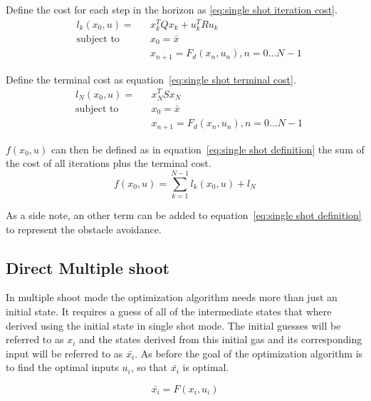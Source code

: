 			Define the cost for each step in the horizon as \ref{eq:single shot iteration cost}.
			\begin{equation}
				\begin{aligned}
				& l_k(x_0,u) = &&  x_k^T Q x_k  +  u_k^T R u_k \\
				& \text{subject to}			&& x_0 = \bar{x} \\
				& 							&&  x_{n+1} = F_d(x_n,u_n), n=0...N-1
				\end{aligned}
				\label{eq:single shot iteration cost}
			\end{equation}
			
			Define the terminal cost as equation~\ref{eq:single shot terminal cost}.
			\begin{equation}
				\begin{aligned}
					& l_N(x_0,u) = && x_N^TSx_N \\
					& \text{subject to}			&& x_0 = \bar{x} \\
					& 							&&  x_{n+1} = F_d(x_n,u_n), n=0...N-1
				\end{aligned}
				\label{eq:single shot terminal cost}
			\end{equation}
			
			$f(x_0,u)$ can then be defined as in equation~\ref{eq:single shot definition} the sum of the cost of all iterations plus the terminal cost.
			\begin{equation}
				f(x_0,u) = \sum_{k=1}^{N-1} l_k(x_0,u) + l_N
				\label{eq:single shot definition}
			\end{equation}
			
			As a side note, an other term can be added to equation~\ref{eq:single shot definition} to represent the obstacle avoidance.
		\subsection{Direct Multiple shoot}
			In multiple shoot mode the optimization algorithm needs more than just an initial state. It requires a guess of all of the intermediate states that where derived using the initial state in  single shot mode. The initial guesses will be referred to as $x_i$ and the states derived from this initial gas and its corresponding input will be referred to as $\bar{x_i}$. As before the goal of the optimization algorithm is to find the optimal inputs $u_i$, so that $\bar{x_i}$ is optimal.
			
			\begin{equation}
				\bar{x_i} = F(x_i,u_i)
				\label{eq:}
			\end{equation}
			
